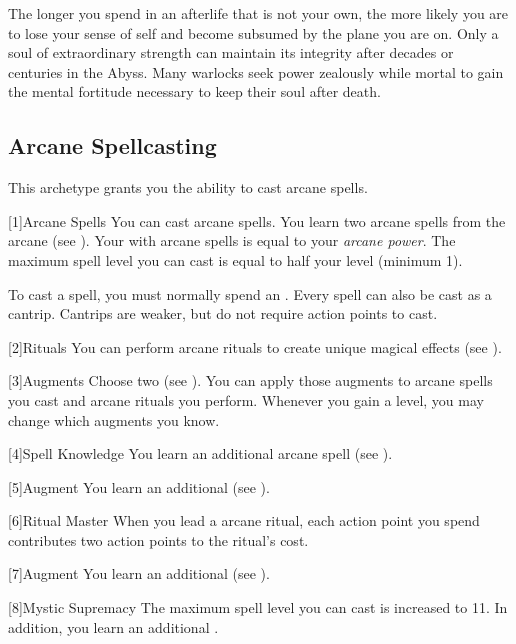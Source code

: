         The longer you spend in an afterlife that is not your own, the more likely you are to lose your sense of self and become subsumed by the plane you are on.
        Only a soul of extraordinary strength can maintain its integrity after decades or centuries in the Abyss.
        Many warlocks seek power zealously while mortal to gain the mental fortitude necessary to keep their soul after death.

    \subsection{Arcane Spellcasting}
        This archetype grants you the ability to cast arcane spells.

        [1]{Arcane Spells}
        You can cast arcane spells.
        You learn two arcane spells from the arcane  (see ).
        Your  with arcane spells is equal to your \textit{arcane power}.
        The maximum spell level you can cast is equal to half your level (minimum 1).

        To cast a spell, you must normally spend an .
        Every spell can also be cast as a cantrip.
        Cantrips are weaker, but do not require action points to cast.

        [2]{Rituals}
        You can perform arcane rituals to create unique magical effects (see ).

        [3]{Augments}
        Choose two  (see ).
        You can apply those augments to arcane spells you cast and arcane rituals you perform.
        Whenever you gain a level, you may change which augments you know.

        [4]{Spell Knowledge}
        You learn an additional arcane spell (see ).

        [5]{Augment}
        You learn an additional  (see ).

        [6]{Ritual Master}
        When you lead a arcane ritual, each action point you spend contributes two action points to the ritual's cost.

        [7]{Augment}
        You learn an additional  (see ).

        [8]{Mystic Supremacy}
        The maximum spell level you can cast is increased to 11.
        In addition, you learn an additional .

